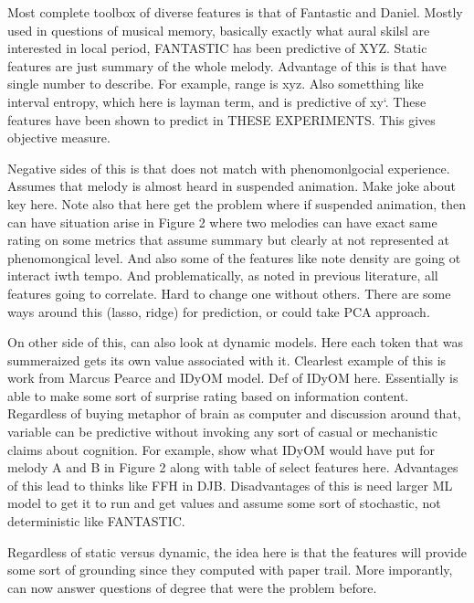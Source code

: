 \documentclass[english,man,floatsintext]{apa6}
\begin{document}
Most complete toolbox of diverse features is that of Fantastic and Daniel.
Mostly used in questions of musical memory, basically exactly what aural skilsl are interested in local period, FANTASTIC has been predictive of XYZ.
Static features are just summary of the whole melody.
Advantage of this is that have single number to describe.
For example, range is xyz.
Also sometthing like interval entropy, which here is layman term, and is predictive of xy`.
These features have been shown to predict in THESE EXPERIMENTS.
This gives objective measure.

Negative sides of this is that does not match with phenomonlgocial experience.
Assumes that melody is almost heard in suspended animation.
Make joke about key here.
Note also that here get the problem where if suspended animation, then can have situation arise in Figure 2 where two melodies can have exact same rating on some metrics that assume summary but clearly at not represented at phenomongical level.
And also some of the features like note density are going ot interact iwth tempo.
And problematically, as noted in previous literature, all features going to correlate.
Hard to change one without others.
There are some ways around this (lasso, ridge) for prediction, or could take PCA approach.

On other side of this, can also look at dynamic models.
Here each token that was summeraized gets its own value associated with it.
Clearlest example of this is work from Marcus Pearce and IDyOM model.
Def of IDyOM here.
Essentially is able to make some sort of surprise rating based on information content.
Regardless of buying metaphor of brain as computer and discussion around that, variable can be predictive without invoking any sort of casual or mechanistic claims about cognition.
For example, show what IDyOM would have put for melody A and B in Figure 2 along with table of select features here.
Advantages of this lead to thinks like FFH in DJB.
Disadvantages of this is need larger ML model to get it to run and get values and assume some sort of stochastic, not deterministic like FANTASTIC.

Regardless of static versus dynamic, the idea here is that the features will provide some sort of grounding since they computed with paper trail.
More imporantly, can now answer questions of degree that were the problem before.
\end{document}
